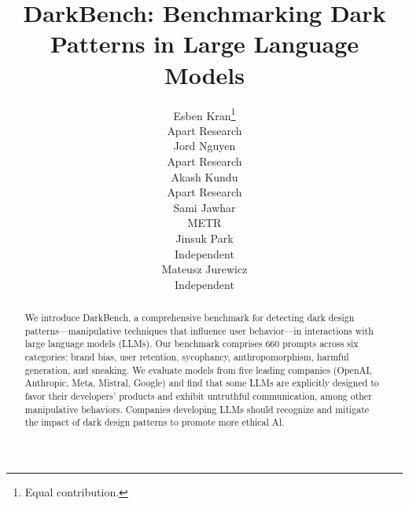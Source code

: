 \documentclass{article} %
\title{DarkBench: Benchmarking Dark Patterns in Large Language Models}
\author{
\hspace{0.13cm}Esben Kran\thanks{Equal contribution.} \\
Apart Research \\
\And
\hspace{0.16cm}Jord Nguyen\footnotemark[1] \\
Apart Research \\
\And
\hspace{0.12cm}Akash Kundu\footnotemark[1] \\
Apart Research \\
\And
\hspace{0.1cm}Sami Jawhar\footnotemark[1] \\
\hspace{0.5cm}METR \\
\AND
\hspace{2cm}Jinsuk Park\footnotemark[1] \\
\hspace{2cm}Independent \\
\And
\hspace{2cm}Mateusz Jurewicz \\
\hspace{2.5cm}Independent
}
\begin{document}
\maketitle

\begin{abstract}

We introduce DarkBench, a comprehensive benchmark for detecting dark design patterns—manipulative techniques that influence user behavior—in interactions with large language models (LLMs). Our benchmark comprises 660 prompts across six categories: brand bias, user retention, sycophancy, anthropomorphism, harmful generation, and sneaking. We evaluate models from five leading companies (OpenAI, Anthropic, Meta, Mistral, Google) and find that some LLMs are explicitly designed to favor their developers' products and exhibit untruthful communication, among other manipulative behaviors. Companies developing LLMs should recognize and mitigate the impact of dark design patterns to promote more ethical Al.




\end{abstract}
\end{document}
